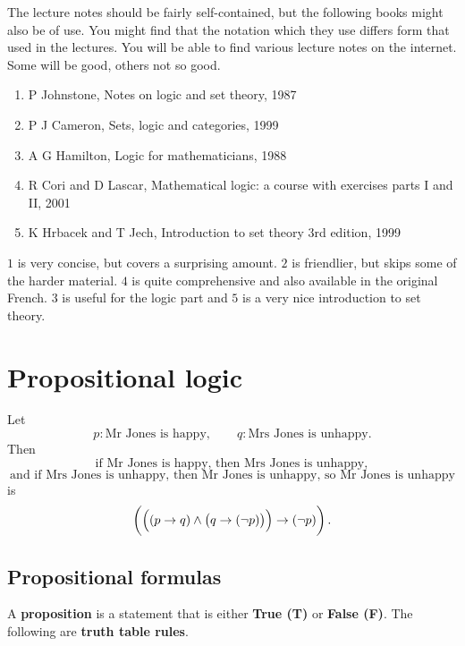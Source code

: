 The lecture notes should be fairly self-contained, but the following books might also be of use. You might find that the notation which they use differs form that used in the lectures. You will be able to find various lecture notes on the internet. Some will be good, others not so good.
\begin{enumerate}
\item P Johnstone, Notes on logic and set theory, 1987
\item P J Cameron, Sets, logic and categories, 1999
\item A G Hamilton, Logic for mathematicians, 1988
\item R Cori and D Lascar, Mathematical logic: a course with exercises parts I and II, 2001
\item K Hrbacek and T Jech, Introduction to set theory 3rd edition, 1999
\end{enumerate}
$ 1 $ is very concise, but covers a surprising amount. $ 2 $ is friendlier, but skips some of the harder material. $ 4 $ is quite comprehensive and also available in the original French. $ 3 $ is useful for the logic part and $ 5 $ is a very nice introduction to set theory.

\pagebreak

\section{Propositional logic}

Let
$$ p : \text{Mr Jones is happy}, \qquad q : \text{Mrs Jones is unhappy}. $$
Then
$$ \text{if Mr Jones is happy, then Mrs Jones is unhappy}, $$
$$ \text{and if Mrs Jones is unhappy, then Mr Jones is unhappy, so Mr Jones is unhappy} $$
is
$$ \impb{\andb{\impb{p}{q}}{\impb{q}{\notb{p}}}}{\notb{p}}. $$

\subsection{Propositional formulas}

A \textbf{proposition} is a statement that is either \textbf{True (T)} or \textbf{False (F)}. The following are \textbf{truth table rules}.


